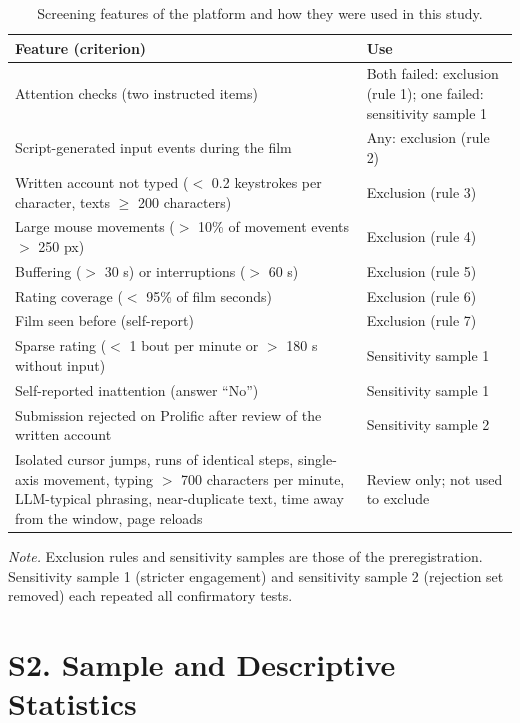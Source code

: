 \documentclass[11pt,a4paper]{article}
\begin{document}
\begin{table}[H]
\caption{Screening features of the platform and how they were used in this study.}
\label{tab:screening}
\small
\begin{tabular}{>{\raggedright\arraybackslash}p{}>{\raggedright\arraybackslash}p{}}
\toprule
Feature (criterion) & Use \\
\midrule
Attention checks (two instructed items) & Both failed: exclusion (rule 1); one failed: sensitivity sample 1 \\
Script-generated input events during the film & Any: exclusion (rule 2) \\
Written account not typed ($<$ 0.2 keystrokes per character, texts $\geq$ 200 characters) & Exclusion (rule 3) \\
Large mouse movements ($>$ 10\% of movement events $>$ 250 px) & Exclusion (rule 4) \\
Buffering ($>$ 30 s) or interruptions ($>$ 60 s) & Exclusion (rule 5) \\
Rating coverage ($<$ 95\% of film seconds) & Exclusion (rule 6) \\
Film seen before (self-report) & Exclusion (rule 7) \\
Sparse rating ($<$ 1 bout per minute or $>$ 180 s without input) & Sensitivity sample 1 \\
Self-reported inattention (answer \enquote{No}) & Sensitivity sample 1 \\
Submission rejected on Prolific after review of the written account & Sensitivity sample 2 \\
Isolated cursor jumps, runs of identical steps, single-axis movement, typing $>$ 700 characters per minute,
LLM-typical phrasing, near-duplicate text, time away from the window, page reloads & Review only; not used to exclude \\
\bottomrule
\end{tabular}
\par\smallskip\footnotesize\textit{Note.} Exclusion rules and sensitivity samples are those of the preregistration. Sensitivity sample 1 (stricter
engagement) and sensitivity sample 2 (rejection set removed) each repeated all confirmatory tests.
\end{table}

\section*{S2. Sample and Descriptive Statistics}
\end{document}
